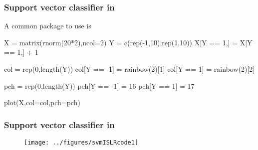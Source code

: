 \documentclass[12pt]{beamer}
\begin{document}
%
%

%
%
%
%
%
%
%

\begin{frame}[fragile]
\frametitle{Support vector classifier in }
A common package to use is 

\vsp
\begin{blockcode}
X = matrix(rnorm(20*2),ncol=2)
Y = c(rep(-1,10),rep(1,10))
X[Y == 1,] = X[Y == 1,] + 1

col = rep(0,length(Y))
col[Y == -1] = rainbow(2)[1]
col[Y == 1] = rainbow(2)[2]

pch = rep(0,length(Y))
pch[Y == -1] = 16
pch[Y == 1] = 17

plot(X,col=col,pch=pch)
\end{blockcode}
\end{frame}

\begin{frame}
\frametitle{Support vector classifier in }
\begin{figure}
\texttt{[image: ../figures/svmISLRcode1]}
\end{figure}
\end{frame}
\end{document}
